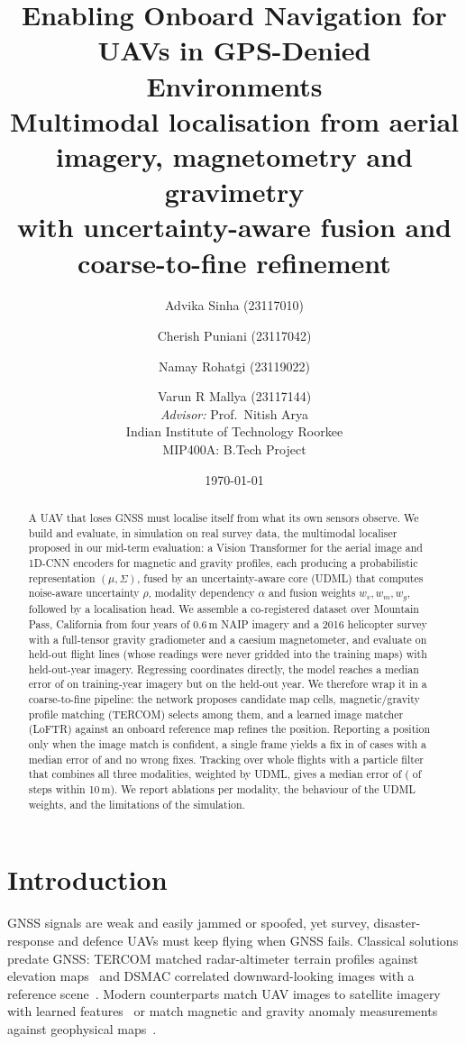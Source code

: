 \documentclass[11pt,a4paper]{article}
\title{\textbf{Enabling Onboard Navigation for UAVs in GPS-Denied Environments}\\[0.4em]
\large Multimodal localisation from aerial imagery, magnetometry and gravimetry\\
with uncertainty-aware fusion and coarse-to-fine refinement}
\author{Advika Sinha (23117010) \and Cherish Puniani (23117042) \and Namay Rohatgi (23119022) \and Varun R Mallya (23117144)\\[0.6em]
\textit{Advisor:} Prof.\ Nitish Arya\\
Indian Institute of Technology Roorkee\\
MIP400A: B.Tech Project}
\date{\today}
\begin{document}
\maketitle

\begin{abstract}
A UAV that loses GNSS must localise itself from what its own sensors observe. We build and evaluate,
in simulation on real survey data, the multimodal localiser proposed in our mid-term evaluation: a
Vision Transformer for the aerial image and 1D-CNN encoders for magnetic and gravity profiles, each
producing a probabilistic representation $(\mu,\Sigma)$, fused by an uncertainty-aware core (UDML)
that computes noise-aware uncertainty $\rho$, modality dependency $\alpha$ and fusion weights
$w_v,w_m,w_g$, followed by a localisation head. We assemble a co-registered dataset over Mountain Pass,
California from four years of 0.6\,m NAIP imagery and a 2016 helicopter survey with a full-tensor
gravity gradiometer and a caesium magnetometer, and evaluate on held-out flight lines (whose readings
were never gridded into the training maps) with held-out-year imagery. Regressing coordinates
directly, the model reaches a median error of \ResvisionmaggravValMedian{} on training-year imagery but
\ResvisionmaggravMedian{} on the held-out year. We therefore wrap it in a coarse-to-fine pipeline: the
network proposes candidate map cells, magnetic/gravity profile matching (TERCOM) selects among them,
and a learned image matcher (LoFTR) against an onboard reference map refines the position. Reporting
a position only when the image match is confident, a single frame yields a fix in \ResSSFixRate{} of
cases with a median error of \ResSSFixMedian{} and no wrong fixes. Tracking over whole flights with a
particle filter that combines all three modalities, weighted by UDML, gives a median error of
\ResPFFullMedian{} (\ResPFFullWithin{} of steps within 10\,m). We report ablations per modality, the
behaviour of the UDML weights, and the limitations of the simulation.
\end{abstract}

\tableofcontents
\clearpage

\section{Introduction}
GNSS signals are weak and easily jammed or spoofed, yet survey, disaster-response and defence UAVs must
keep flying when GNSS fails. Classical solutions predate GNSS: TERCOM matched radar-altimeter terrain
profiles against elevation maps~\cite{golden1980tercom} and DSMAC correlated downward-looking images with
a reference scene~\cite{carr1980dsmac}. Modern counterparts match UAV images to satellite imagery with
learned features~\cite{goforth2019gps,patel2020visual,hierarchical2025} or match magnetic and gravity
anomaly measurements against geophysical maps~\cite{canciani2016absolute,gravityreview2026}.
\end{document}
